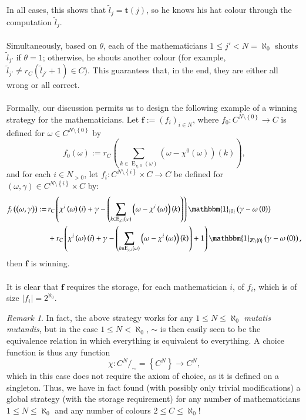 \documentclass[11pt, a4paper, oneside]{article}
\theoremstyle{remark}
\newtheorem*{remark}{Remark}
\theoremstyle{lemma}
\begin{document}
In all cases, this shows that \(\tilde{l}_j = \mathbf{t}(j)\), so he knows his hat colour through the computation \(\tilde{l}_j\).
\\\\
Simultaneously, based on \(\theta\), each of the mathematicians \(1 \leq j' < N = \aleph_0\) shouts \(\tilde{l}_{j'}\) if \(\theta = 1\); otherwise, he shouts another colour (for example, \(\tilde{l}_{j'} \neq r_{C}\left(\tilde{l}_{j'} + 1\right) \in C\)). This guarantees that, in the end, they are either all wrong or all correct.
\\\\
Formally, our discussion permits us to design the following example of a winning strategy for the mathematicians. Let \( \mathbf{f} := \left( f_i \right)_{i \in N} \), where \( f_0 : C^{N \setminus \left\{ 0 \right\}} \rightarrow C \) is defined for \( \omega \in C^{N \setminus \left\{ 0 \right\}} \) by
\[
f_0\left( \omega \right) := r_{C}\left( \sum_{k \in \operatorname{E}_{\chi,0}(\omega)} \left( \omega - \chi^{0}\left( \omega \right) \right)\left( k \right) \right),
\]
and for each \( i \in N_{>0} \), let \( f_i : C^{N \setminus \left\{ i \right\}} \times C \rightarrow C \) be defined for \( \left( \omega, \gamma \right) \in C^{N \setminus \left\{ i \right\}} \times C \) by:
\begin{align*}
f_i\left( \left( \omega, \gamma \right) \right) :=\,& 
 r_{C} \left( \chi^{i}\left( \omega \right)\left( i \right) + \gamma - \left( \sum_{k \in \operatorname{E}_{\chi,i}(\omega)} \left( \omega - \chi^{i}\left( \omega \right) \right)\left( k \right) \right) \right) \mathbbm{1}_{\left\{ 0 \right\}} \left( \gamma - \omega\left( 0 \right) \right) \\
& +  r_{C} \left( \chi^{i}\left( \omega \right)\left( i \right) + \gamma - \left( \sum_{k \in \operatorname{E}_{\chi,i}(\omega)} \left( \omega - \chi^{i}\left( \omega \right) \right)\left( k \right) \right) + 1 \right) \mathbbm{1}_{\mathbb{Z} \setminus \left\{ 0 \right\}} \left( \gamma - \omega\left( 0 \right) \right),
\end{align*}
then \( \mathbf{f} \) is winning.
\\\\
It is clear that \( \mathbf{f} \) requires the storage, for each mathematician \( i \), of \( f_i \), which is of size \( \left| f_i \right| = 2^{\aleph_0} \).
\begin{remark}
In fact, the above strategy works for any \( 1 \leq N \leq \aleph_0 \) \textit{mutatis mutandis}, but in the case \( 1 \leq N < \aleph_0 \), \( \sim \) is then easily seen to be the equivalence relation in which everything is equivalent to everything. A choice function is thus any function
\[
\chi : C^{N} /_{\sim} = \left\{ C^{N} \right\} \rightarrow C^{N},
\]
which in this case does not require the axiom of choice, as it is defined on a singleton. Thus, we have in fact found (with possibly only trivial modifications) a global strategy (with the storage requirement) for any number of mathematicians \( 1 \leq N \leq \aleph_0 \) and any number of colours \( 2 \leq C \leq \aleph_0 \)!
\end{remark}
\end{document}
